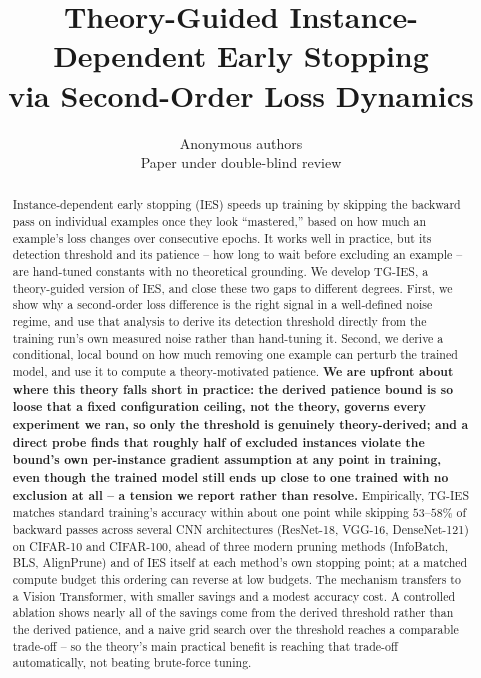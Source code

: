 \documentclass{article}
\title{Theory-Guided Instance-Dependent Early Stopping \\ via Second-Order Loss Dynamics}
\author{Anonymous authors \\ Paper under double-blind review}
\theoremstyle{plain}
\theoremstyle{definition}
\theoremstyle{remark}
\begin{document}
\maketitle

\begin{abstract}
Instance-dependent early stopping (IES) speeds up training by skipping the backward pass on individual examples once they look ``mastered,'' based on how much an example's loss changes over consecutive epochs. It works well in practice, but its detection threshold and its patience -- how long to wait before excluding an example -- are hand-tuned constants with no theoretical grounding. We develop TG-IES, a theory-guided version of IES, and close these two gaps to different degrees. First, we show why a second-order loss difference is the right signal in a well-defined noise regime, and use that analysis to derive its detection threshold directly from the training run's own measured noise rather than hand-tuning it. Second, we derive a conditional, local bound on how much removing one example can perturb the trained model, and use it to compute a theory-motivated patience. \textbf{We are upfront about where this theory falls short in practice: the derived patience bound is so loose that a fixed configuration ceiling, not the theory, governs every experiment we ran, so only the threshold is genuinely theory-derived; and a direct probe finds that roughly half of excluded instances violate the bound's own per-instance gradient assumption at any point in training, even though the trained model still ends up close to one trained with no exclusion at all -- a tension we report rather than resolve.} Empirically, TG-IES matches standard training's accuracy within about one point while skipping $53$--$58\%$ of backward passes across several CNN architectures (ResNet-18, VGG-16, DenseNet-121) on CIFAR-10 and CIFAR-100, ahead of three modern pruning methods (InfoBatch, BLS, AlignPrune) and of IES itself at each method's own stopping point; at a matched compute budget this ordering can reverse at low budgets. The mechanism transfers to a Vision Transformer, with smaller savings and a modest accuracy cost. A controlled ablation shows nearly all of the savings come from the derived threshold rather than the derived patience, and a naive grid search over the threshold reaches a comparable trade-off -- so the theory's main practical benefit is reaching that trade-off automatically, not beating brute-force tuning.
\end{abstract}
\end{document}
